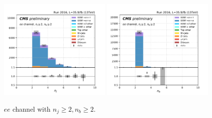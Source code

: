 \begin{figure}[ht]
    \includegraphics[width=0.49\textwidth]{chapters/Analysis/sectionPlots/figures/kinematics_pickles/ee/2b/ee_2b_nJets.pdf}
    \includegraphics[width=0.49\textwidth]{chapters/Analysis/sectionPlots/figures/kinematics_pickles/ee/2b/ee_2b_nBJets.pdf}
    
    \caption{$ee$ channel with $n_j\geq2, n_b\geq2$.}
\end{figure}

